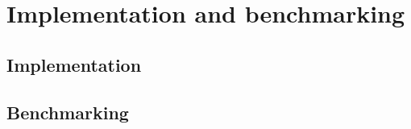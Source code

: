 \chapter{Implementation and benchmarking}
\label{kap:kap4}

\section{Implementation}

\section{Benchmarking}